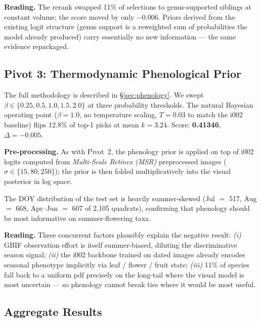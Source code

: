 \documentclass[10pt,twocolumn,letterpaper]{article}
\begin{document}
\textbf{Reading.} The rerank swapped 11\% of selections to genus-supported siblings at constant volume; the score moved by only $-0.006$. Priors derived from the existing logit structure (genus support is a reweighted sum of probabilities the model already produced) carry essentially no new information --- the same evidence repackaged.

\subsection{Pivot 3: Thermodynamic Phenological Prior}

The full methodology is described in \S\ref{sec:phenology}. We swept $\beta \in \{0.25, 0.5, 1.0, 1.5, 2.0\}$ at three probability thresholds. The natural Bayesian operating point ($\beta{=}1.0$, no temperature scaling, $T{=}0.03$ to match the i002 baseline) flips 12.8\% of top-1 picks at mean $k{=}3.24$. Score: \textbf{0.41346}, $\Delta = -0.005$.

\textbf{Pre-processing.} As with Pivot~2, the phenology prior is applied on top of i002 logits computed from \textit{Multi-Scale Retinex (MSR)} preprocessed images ($\sigma \in \{15, 80, 250\}$); the prior is then folded multiplicatively into the visual posterior in log space.

The DOY distribution of the test set is heavily summer-skewed (Jul $=$ 517, Aug $=$ 668, Apr--Jun $=$ 607 of 2{,}105 quadrats), confirming that phenology should be most informative on summer-flowering taxa.

\textbf{Reading.} Three concurrent factors plausibly explain the negative result: \textit{(i)} GBIF observation effort is itself summer-biased, diluting the discriminative season signal; \textit{(ii)} the i002 backbone trained on dated images already encodes seasonal phenotype implicitly via leaf / flower / fruit state; \textit{(iii)} 11\% of species fall back to a uniform pdf precisely on the long-tail where the visual model is most uncertain --- so phenology cannot break ties where it would be most useful.

\subsection{Aggregate Results}
\end{document}
